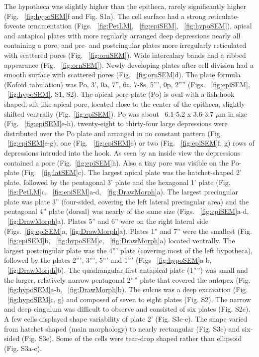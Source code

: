 \documentclass[12pt]{article}
\begin{document}
\FloatBarrier
The hypotheca was slightly higher than the epitheca, rarely significantly higher (Fig. ~\ref{fig:hypoSEM}f and Fig. S1a).
The cell surface had a strong  reticulate-foveate ornamentation (Figs. ~\ref{fig:PetLM}, ~\ref{fig:epiSEM}, ~\ref{fig:hypoSEM}), apical and antapical plates with more regularly arranged deep depressions nearly all containing a pore, and pre- and postcingular plates more irregularly reticulated with scattered pores (Fig. ~\ref{fig:ornSEM}). 
Wide intercalary bands had a ribbed appearance (Fig. ~\ref{fig:ornSEM}). 
Newly developing plates after cell division had a smooth surface with scattered pores (Fig. ~\ref{fig:ornSEM}d). 
The plate formula (Kofoid tabulation) was Po, 3', 0a, 7'', 6c, 7-8s, 5''', 0p, 2'''' (Figs. ~\ref{fig:epiSEM}, ~\ref{fig:hypoSEM}, S1, S2).
The apical pore plate (Po) is oval with a fish-hook shaped, slit-like apical pore, located close to the center of the epitheca, slightly shifted ventrally (Fig.~\ref{fig:epiSEM}). 
Po was about ~6.1-5.2 x 3.6-3.7 $\mu$m in size (Fig. ~\ref{fig:epiSEM}e-h). 
twenty-eight to thirty-four large depressions were distributed over the Po plate and arranged in no constant pattern (Fig. ~\ref{fig:epiSEM}e-g); one (Fig. ~\ref{fig:epiSEM}e) or two (Fig. ~\ref{fig:epiSEM}f, g) rows of depressions intruded into the hook. 
As seen by an inside view the depressions contained a pore (Fig.~\ref{fig:epiSEM}h). 
Also a tiny pore was visible on the Po-plate (Fig. ~\ref{fig:latSEM}c). 
The largest apical plate was the hatchet-shaped 2' plate, followed by the pentagonal 3' plate and the hexagonal 1' plate (Fig. ~\ref{fig:PetLM}c, ~\ref{fig:epiSEM}a-d, ~\ref{fig:DrawMorph}a).  
The largest precingular plate was plate 3'' (four-sided, covering the left lateral precingular area) and the pentagonal 4'' plate (dorsal) was nearly of the same size (Figs. ~\ref{fig:epiSEM}a-d, ~\ref{fig:DrawMorph}a).  
Plates 5'' and 6'' were on the right lateral side (Figs.~\ref{fig:epiSEM}a, \ref{fig:DrawMorph}a).  
Plates 1'' and 7'' were the smallest (Fig. ~\ref{fig:epiSEM}b, ~\ref{fig:hypoSEM}c, ~\ref{fig:DrawMorph}a) located ventrally.  
The largest postcingular plate was the 4''' plate (covering most of the left hypotheca), followed by the plates 2''', 3''', 5''' and 1''' (Figs ~\ref{fig:hypoSEM}a-b, ~\ref{fig:DrawMorph}b). 
The quadrangular first antapical plate (1'''') was small and the larger, relatively narrow pentagonal 2'''' plate that covered the antapex (Fig. ~\ref{fig:hypoSEM}a-b, ~\ref{fig:DrawMorph}b). 
The sulcus was a deep excavation (Fig. ~\ref{fig:hypoSEM}c, g) and composed of seven to eight plates (Fig. S2). 
The narrow and deep cingulum was difficult to observe and consisted of six plates (Fig. S2c). 
A few cells displayed shape variability of plate 2' (Fig. S3c-e). 
The shape varied from hatchet shaped (main morphology) to nearly rectangular (Fig. S3c) and six-sided (Fig. S3e).  
Some of the cells were tear-drop shaped rather than ellipsoid (Fig. S3a-c). 
\end{document}

